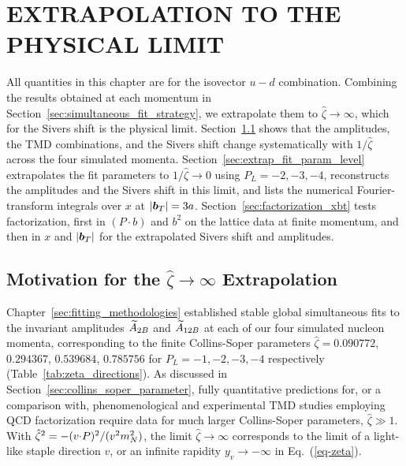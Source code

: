 \section{EXTRAPOLATION TO THE PHYSICAL LIMIT}
\label{sec:physical_limit_extrapolation}

All quantities in this chapter are for the isovector $u-d$ combination. Combining the results obtained at each momentum in Section~\ref{sec:simultaneous_fit_strategy}, we extrapolate them to $\hat{\zeta}\to\infty$, which for the Sivers shift is the physical limit. Section~\ref{sec:zetahat_extrapolation_motivation} shows that the amplitudes, the TMD combinations, and the Sivers shift change systematically with $1/\hat\zeta$ across the four simulated momenta. Section~\ref{sec:extrap_fit_param_level} extrapolates the fit parameters to $1/\hat\zeta\to0$ using $P_L=-2,-3,-4$, reconstructs the amplitudes and the Sivers shift in this limit, and lists the numerical Fourier-transform integrals over $x$ at $|\boldsymbol{b}_T|=3a$. Section~\ref{sec:factorization_xbt} tests factorization, first in $(P\cdot b)$ and $b^2$ on the lattice data at finite momentum, and then in $x$ and $|\boldsymbol{b}_T|$ for the extrapolated Sivers shift and amplitudes.

\subsection{Motivation for the \texorpdfstring{$\hat{\zeta} \to \infty$}{zeta-hat to infinity} Extrapolation}
\label{sec:zetahat_extrapolation_motivation}

Chapter~\ref{sec:fitting_methodologies} established stable global simultaneous fits to the invariant amplitudes $\widetilde{A}_{2B}$ and $\widetilde{A}_{12B}$ at each of our four simulated nucleon momenta, corresponding to the finite Collins-Soper parameters $\hat\zeta = 0.090772$, $0.294367$, $0.539684$, $0.785756$ for $P_L=-1,-2,-3,-4$ respectively (Table~\ref{tab:zeta_directions}). As discussed in Section~\ref{sec:collins_soper_parameter}, fully quantitative predictions for, or a comparison with, 
phenomenological and experimental TMD studies employing QCD factorization require data for much larger Collins-Soper parameters,
$\hat\zeta \gg 1$.
With $\hat \zeta^2=- (v {\cdot} P)^2/(v^2m_N^2)$, the limit $\hat\zeta\rightarrow\infty$ 
corresponds to the limit of a light-like staple direction $v$,
or an infinite rapidity $y_v\rightarrow -\infty$ in Eq.~(\ref{eq-zeta}). 

